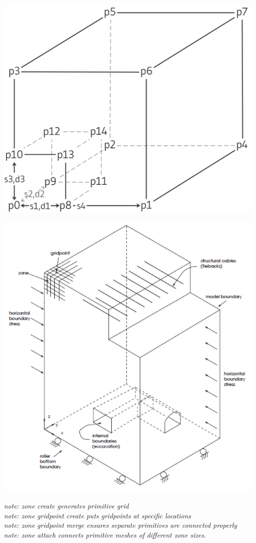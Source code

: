 \documentclass[a4paper, nobind]{templates/ociamthesis}
\begin{document}
\includegraphics[width=1\linewidth]{myfigureeeeee/radial-square}

\includegraphics[width=1\linewidth]{myfigureeeeee/example-FLAC3D-Model}

\emph{note: zone create generates primitive grid}\\
\emph{note: zone gridpoint create puts gridpoints at specific locations}\\
\emph{note: zone gridpoint merge ensures separate primitives are connected
properly}\\
\emph{note: zone attach connects primitive meshes of different zone sizes.}
\end{document}
